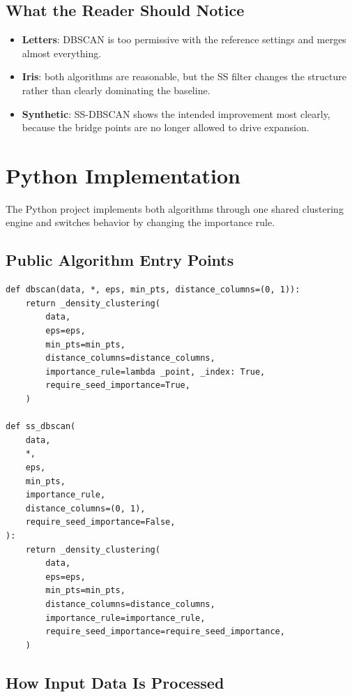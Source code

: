 \documentclass[11pt,a4paper]{article}
\begin{document}
\subsection{What the Reader Should Notice}

\begin{itemize}
\item \textbf{Letters}: DBSCAN is too permissive with the reference settings and
merges almost everything.
\item \textbf{Iris}: both algorithms are reasonable, but the SS filter changes
the structure rather than clearly dominating the baseline.
\item \textbf{Synthetic}: SS-DBSCAN shows the intended improvement most clearly,
because the bridge points are no longer allowed to drive expansion.
\end{itemize}

\section{Python Implementation}

The Python project implements both algorithms through one shared clustering
engine and switches behavior by changing the importance rule.

\subsection{Public Algorithm Entry Points}

\begin{lstlisting}[style=pythonstyle,caption={Public DBSCAN and SS-DBSCAN entry points used in the project.}]
def dbscan(data, *, eps, min_pts, distance_columns=(0, 1)):
    return _density_clustering(
        data,
        eps=eps,
        min_pts=min_pts,
        distance_columns=distance_columns,
        importance_rule=lambda _point, _index: True,
        require_seed_importance=True,
    )

def ss_dbscan(
    data,
    *,
    eps,
    min_pts,
    importance_rule,
    distance_columns=(0, 1),
    require_seed_importance=False,
):
    return _density_clustering(
        data,
        eps=eps,
        min_pts=min_pts,
        distance_columns=distance_columns,
        importance_rule=importance_rule,
        require_seed_importance=require_seed_importance,
    )
\end{lstlisting}

\subsection{How Input Data Is Processed}
\end{document}
